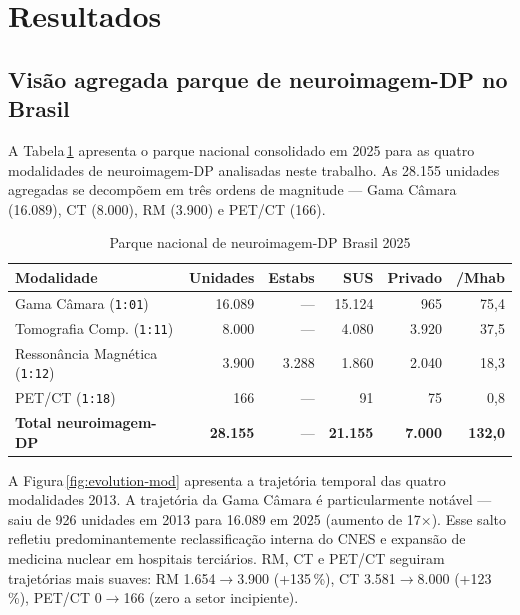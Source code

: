 \documentclass[12pt,a4paper,oneside]{article}
\begin{document}
\section{Resultados}\label{sec:resultados}

\subsection{Visão agregada \textendash{} parque de neuroimagem-DP no Brasil}

A Tabela\,\ref{tab:agregado} apresenta o parque nacional consolidado
em 2025 para as quatro modalidades de neuroimagem-DP analisadas neste
trabalho. As 28.155 unidades agregadas se decompõem em três ordens
de magnitude — Gama Câmara (16.089), CT (8.000), RM (3.900) e
PET/CT (166).

\begin{table}[H]
\centering
\caption{Parque nacional de neuroimagem-DP \textendash{} Brasil 2025}
\begin{tabular}{lrrrrr}
\toprule
\textbf{Modalidade} & \textbf{Unidades} & \textbf{Estabs} & \textbf{SUS} & \textbf{Privado} & \textbf{/Mhab} \\
\midrule
Gama Câmara (\texttt{1:01}) & 16.089 & — & 15.124 & 965 & 75,4 \\
Tomografia Comp. (\texttt{1:11}) &  8.000 & — & 4.080 & 3.920 & 37,5 \\
Ressonância Magnética (\texttt{1:12}) &  3.900 & 3.288 & 1.860 & 2.040 & 18,3 \\
PET/CT (\texttt{1:18}) &    166 & — & 91   & 75   & 0,8  \\
\midrule
\textbf{Total neuroimagem-DP} & \textbf{28.155} & — & \textbf{21.155} & \textbf{7.000} & \textbf{132,0} \\
\bottomrule
\end{tabular}
\par{}
\label{tab:agregado}
\end{table}

A Figura\,\ref{fig:evolution-mod} apresenta a trajetória temporal
das quatro modalidades 2013. A trajetória da Gama
Câmara é particularmente notável — saiu de 926 unidades em 2013
para 16.089 em 2025 (aumento de 17$\times$). Esse salto refletiu
predominantemente reclassificação interna do CNES e expansão de
medicina nuclear em hospitais terciários. RM, CT e PET/CT
seguiram trajetórias mais suaves: RM 1.654$\rightarrow$3.900
(+135\,\%), CT 3.581$\rightarrow$8.000 (+123\,\%), PET/CT
0$\rightarrow$166 (zero a setor incipiente).
\end{document}
